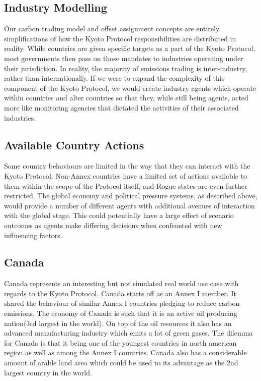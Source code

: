 \subsection{Industry Modelling}

Our carbon trading model and offset assignment concepts are entirely simplifications of how the Kyoto Protocol responsibilities are distributed in reality. While countries are given specific targets as a part of the Kyoto Protocol, most governments then pass on those mandates to industries operating under their jurisdiction. In reality, the majority of emissions trading is inter-industry, rather than internationally. If we were to expand the complexity of this component of the Kyoto Protocol, we would create industry agents which operate within countries and alter countries so that they, while still being agents, acted more like monitoring agencies that dictated the activities of their associated industries.

\subsection{Available Country Actions}

Some country behaviours are limited in the way that they can interact with the Kyoto Protocol. Non-Annex countries have a limited set of actions available to them within the scope of the Protocol itself, and Rogue states are even further restricted. The global economy and political pressure systems, as described above, would provide a number of different agents with additional avenues of interaction with the global stage. This could potentially have a large effect of scenario outcomes as agents make differing decisions when confronted with new influencing factors.

\subsection{Canada}

Canada represents an interesting but not simulated real world use case with regards to the Kyoto Protocol. Canada starts off as an Annex I member. It shared the behaviour of similar Annex I countries pledging to reduce carbon emissions. The economy of Canada is such that it is an active oil producing nation(3rd largest in the world). On top of the oil resources it also has an advanced manufacturing industry which emits a lot of green gases. The dilemma for Canada is that it being one of the youngest countries in north american region as well as among the Annex I countries. Canada also has a considerable amount of arable land area which could be used to its advantage as the 2nd largest country in the world.

